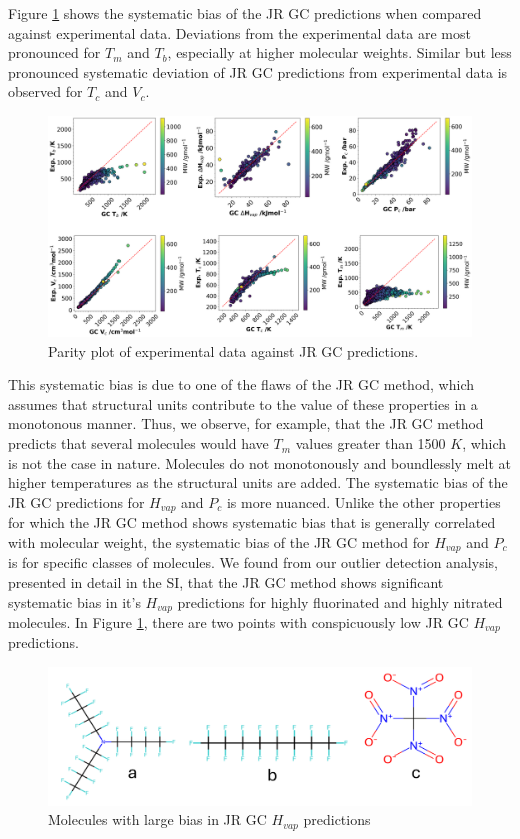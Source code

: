 \documentclass[journal=jacsat,manuscript=article]{achemso}
\begin{document}
Figure \ref{fig:2D_JRGC_bias} shows the systematic bias of the JR GC predictions when compared against experimental data. Deviations from the experimental data are most pronounced for $T_m$ and $T_b$, especially at higher molecular weights. Similar but less pronounced systematic deviation of JR GC predictions from experimental data is observed for $T_c$ and $V_c$.   

\begin{figure}[H]
    \centering
    \includegraphics[width=1.1\linewidth]{images/2D_GC_bias.png}
    \caption{Parity plot of experimental data against JR GC predictions.}
    \label{fig:2D_JRGC_bias}
\end{figure}

This systematic bias is due to one of the flaws of the JR GC method, which assumes that structural units contribute to the value of these properties in a monotonous manner. Thus, we observe, for example, that the JR GC method predicts that several molecules would have $T_m$ values greater than 1500 $K$, which is not the case in nature. Molecules do not monotonously and boundlessly melt at higher temperatures as the structural units are added.
The systematic bias of the JR GC predictions for $H_{vap}$ and $P_c$ is more nuanced. Unlike the other properties for which the JR GC method shows systematic bias that is generally correlated with molecular weight, the systematic bias of the JR GC method for $H_{vap}$ and $P_c$ is for specific classes of molecules.
We found from our outlier detection analysis, presented in detail in the SI, that the JR GC method shows significant systematic bias in it's $H_{vap}$ predictions for highly fluorinated and highly nitrated molecules. In Figure \ref{fig:2D_JRGC_bias}, there are two points with conspicuously low JR GC $H_{vap}$ predictions. 


\begin{figure}[H]
    \centering
    \includegraphics[width=0.8\linewidth]{images/Hvap_molecules_with_large_bias.png}
    \caption{Molecules with large bias in JR GC $H_{vap}$ predictions}
    \label{fig:JRGC_Hvap_bias_molecules}
\end{figure}
\end{document}
